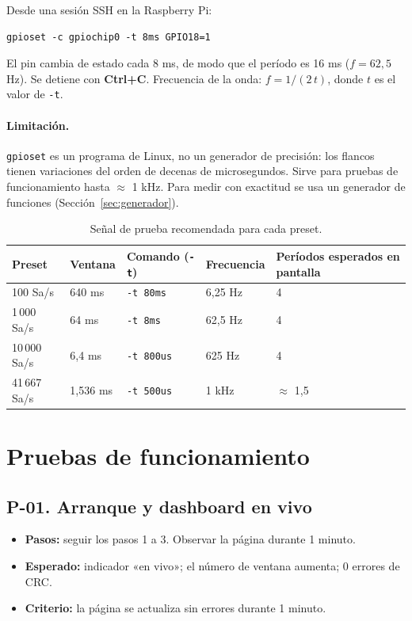 \documentclass[12pt,a4paper]{article}
\begin{document}
Desde una sesión SSH en la Raspberry Pi:

\begin{verbatim}
gpioset -c gpiochip0 -t 8ms GPIO18=1
\end{verbatim}

El pin cambia de estado cada 8 ms, de modo que el período es 16 ms ($f = 62{,}5$ Hz). Se detiene con \textbf{Ctrl+C}. Frecuencia de la onda: $f = 1 / (2\,t)$, donde $t$ es el valor de \texttt{-t}.

\paragraph{Limitación.} \texttt{gpioset} es un programa de Linux, no un generador de precisión: los flancos tienen variaciones del orden de decenas de microsegundos. Sirve para pruebas de funcionamiento hasta $\approx$ 1 kHz. Para medir con exactitud se usa un generador de funciones (Sección~\ref{sec:generador}).

\begin{table}[H]
\centering
\small
\begin{tabular}{@{}p{2.4cm} p{2.4cm} p{3.0cm} p{2.4cm} p{3.6cm}@{}}
\toprule
\textbf{Preset} & \textbf{Ventana} & \textbf{Comando (\texttt{-t})} & \textbf{Frecuencia} & \textbf{Períodos esperados en pantalla} \\
\midrule
100 Sa/s     & 640 ms     & \texttt{-t 80ms}  & 6{,}25 Hz & 4 \\
1\,000 Sa/s  & 64 ms      & \texttt{-t 8ms}   & 62{,}5 Hz & 4 \\
10\,000 Sa/s & 6{,}4 ms   & \texttt{-t 800us} & 625 Hz    & 4 \\
41\,667 Sa/s & 1{,}536 ms & \texttt{-t 500us} & 1 kHz     & $\approx$ 1{,}5 \\
\bottomrule
\end{tabular}
\caption{Señal de prueba recomendada para cada preset.}
\label{tab:senal}
\end{table}

\section{Pruebas de funcionamiento}

\subsection*{P-01. Arranque y dashboard en vivo}
\begin{itemize}
  \item \textbf{Pasos:} seguir los pasos 1 a 3. Observar la página durante 1 minuto.
  \item \textbf{Esperado:} indicador «en vivo»; el número de ventana aumenta; 0 errores de CRC.
  \item \textbf{Criterio:} la página se actualiza sin errores durante 1 minuto.
\end{itemize}
\end{document}

